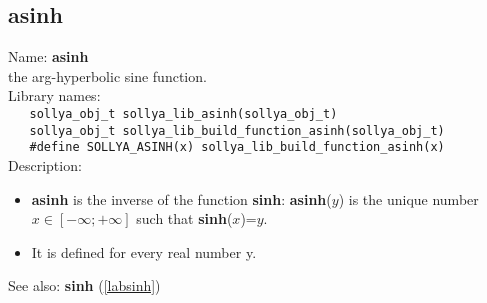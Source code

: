\subsection{asinh}
\label{labasinh}
\noindent Name: \textbf{asinh}\\
\phantom{aaa}the arg-hyperbolic sine function.\\[0.2cm]
\noindent Library names:\\
\verb|   sollya_obj_t sollya_lib_asinh(sollya_obj_t)|\\
\verb|   sollya_obj_t sollya_lib_build_function_asinh(sollya_obj_t)|\\
\verb|   #define SOLLYA_ASINH(x) sollya_lib_build_function_asinh(x)|\\[0.2cm]
\noindent Description: \begin{itemize}

\item \textbf{asinh} is the inverse of the function \textbf{sinh}: \textbf{asinh}($y$) is the unique number 
   $x \in [-\infty; +\infty]$ such that \textbf{sinh}($x$)=$y$.

\item It is defined for every real number y.
\end{itemize}
See also: \textbf{sinh} (\ref{labsinh})
